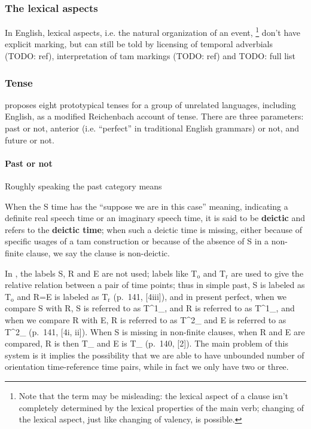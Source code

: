 \documentclass[UTF8, a4paper, oneside, scheme=plain, 12pt]{ctexbook}
\newcommand*{\citepage}[1]{p.~{#1}}
\newcommand*{\concept}[1]{\textbf{#1}}
\newcommand{\referredtime}{T$_{\text{r}}$}
\newcommand{\orientationtime}{T$_{\text{o}}$}
\begin{document}
\subsubsection{The lexical aspects}

In English, lexical aspects, i.e. the natural organization of an event,%
\footnote{
    Note that the term may be misleading:
    the lexical aspect of a clause 
    isn't completely determined by the lexical properties of the main verb;
    changing of the lexical aspect, just like changing of valency, is possible.
}
don't have explicit marking, 
but can still be told by licensing of temporal adverbials (TODO: ref),
interpretation of \acs{tam} markings (TODO: ref) and TODO: full list

\subsubsection{Tense}

\citet[see also {\citet[\citepage{82}]{cinque1999adverbs}}]{vikner1985reichenbach} proposes 
eight prototypical tenses for a group of unrelated languages,
including English,
as a modified Reichenbach account of tense.
There are three parameters:
past or not, anterior (i.e. ``perfect'' in traditional English grammars) or not,
and future or not.

\paragraph{Past or not} Roughly speaking the past category 
means 

When the S time has the ``suppose we are in this case'' meaning, 
indicating a definite real speech time or an imaginary speech time, 
it is said to be \concept{deictic}
and refers to the \concept{deictic time};
when such a deictic time is missing,
either because of specific usages of a \acs{tam} construction
or because of the absence of S in a non-finite clause,
we say the clause is non-deictic.



In \citet{cgel}, the labels S, R and E are not used;
labels like \orientationtime{} and \referredtime{}
are used to give the relative relation between a pair of time points;
thus in simple past, 
S is labeled as \orientationtime{} and R=E is labeled as \referredtime{}
(\citepage{141}, [4iii]),
and in present perfect, 
when we compare S with R,
S is referred to as T^1_{},
and R is referred to as T^1_{},
and when we compare R with E, 
R is referred to as T^2_{} 
and E is referred to as T^2_{} (\citepage{141}, [4i, ii]).
When S is missing in non-finite clauses, 
when R and E are compared, 
R is then T_{} and E is T_{} (\citepage{140}, [2]).
The main problem of this system 
is it implies the possibility that 
we are able to have unbounded number of orientation time-reference time pairs,
while in fact we only have two or three.
\end{document}
